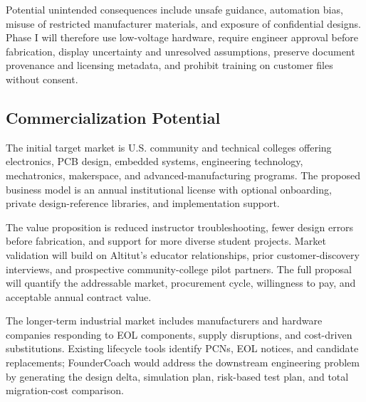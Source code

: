 \documentclass[12pt,letterpaper]{article}
\begin{document}
Potential unintended consequences include unsafe guidance, automation bias, misuse of restricted manufacturer materials, and exposure of confidential designs. Phase I will therefore use low-voltage hardware, require engineer approval before fabrication, display uncertainty and unresolved assumptions, preserve document provenance and licensing metadata, and prohibit training on customer files without consent.

\subsection{Commercialization Potential}



The initial target market is U.S. community and technical colleges offering electronics, PCB design, embedded systems, engineering technology, mechatronics, makerspace, and advanced-manufacturing programs. The proposed business model is an annual institutional license with optional onboarding, private design-reference libraries, and implementation support.

The value proposition is reduced instructor troubleshooting, fewer design errors before fabrication, and support for more diverse student projects. Market validation will build on Altitut's educator relationships, prior customer-discovery interviews, and prospective community-college pilot partners. The full proposal will quantify the addressable market, procurement cycle, willingness to pay, and acceptable annual contract value.

The longer-term industrial market includes manufacturers and hardware companies responding to EOL components, supply disruptions, and cost-driven substitutions. Existing lifecycle tools identify PCNs, EOL notices, and candidate replacements; FounderCoach would address the downstream engineering problem by generating the design delta, simulation plan, risk-based test plan, and total migration-cost comparison.
\end{document}
